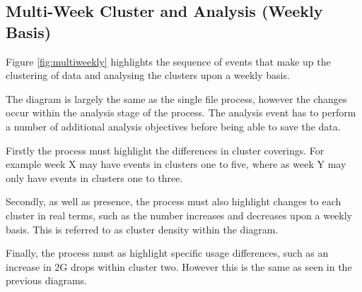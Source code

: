\newpage
\subsection{Multi-Week Cluster and Analysis (Weekly Basis)}
Figure \ref{fig:multiweekly} highlights the sequence of events that make up 
the clustering of data and analysing the clusters upon a weekly basis.

The diagram is largely the same as the single file process, however the changes 
occur within the analysis stage of the process. The analysis event has to 
perform a number of additional analysis objectives before being able to save 
the data.

Firstly the process must highlight the differences in cluster coverings. For 
example week X may have events in clusters one to five, where as week Y may 
only have events in clusters one to three. 

Secondly, as well as presence, the process must also highlight changes to each 
cluster in real terms, such as the number increases and decreases upon a weekly 
basis. This is referred to as cluster density within the diagram.

Finally, the process must as highlight specific usage differences, such as an 
increase in 2G drops within cluster two. However this is the same as seen in 
the previous diagrams.




